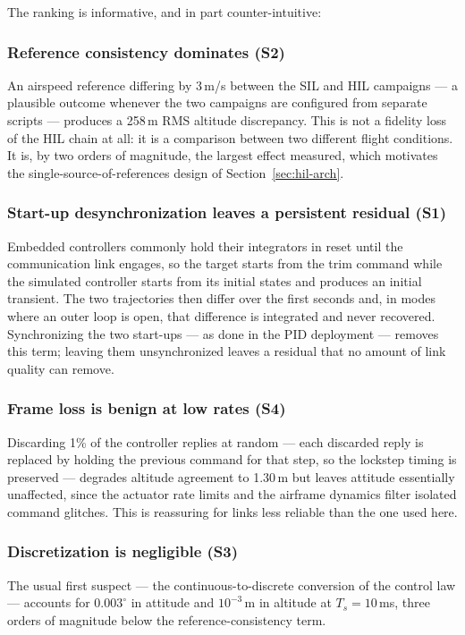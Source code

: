 The ranking is informative, and in part counter-intuitive:

\subsubsection{Reference consistency dominates (S2)} An airspeed reference
differing by 3\,m/s between the SIL and HIL campaigns --- a plausible
outcome whenever the two campaigns are configured from separate scripts
--- produces a 258\,m RMS altitude discrepancy. This is not a fidelity
loss of the HIL chain at all: it is a comparison between two different
flight conditions. It is, by two orders of magnitude, the largest effect
measured, which motivates the single-source-of-references design of
Section~\ref{sec:hil-arch}.

\subsubsection{Start-up desynchronization leaves a persistent residual (S1)}
Embedded controllers commonly hold their integrators in reset until the
communication link engages, so the target starts from the trim command
while the simulated controller starts from its initial states and produces
an initial transient. The two trajectories then differ over the first
seconds and, in modes where an outer loop is open, that difference is
integrated and never recovered. Synchronizing the two start-ups --- as
done in the PID deployment --- removes this term; leaving them
unsynchronized leaves a residual that no amount of link quality can
remove.

\subsubsection{Frame loss is benign at low rates (S4)} Discarding 1\% of
the controller replies at random --- each discarded reply is replaced by
holding the previous command for that step, so the lockstep timing is
preserved --- degrades altitude agreement to 1.30\,m
but leaves attitude essentially unaffected, since the actuator rate limits
and the airframe dynamics filter isolated command glitches. This is
reassuring for links less reliable than the one used here.

\subsubsection{Discretization is negligible (S3)} The usual first suspect
--- the continuous-to-discrete conversion of the control law --- accounts
for $0.003^\circ$ in attitude and $10^{-3}$\,m in altitude at
$T_s=10$\,ms, three orders of magnitude below the reference-consistency
term.

